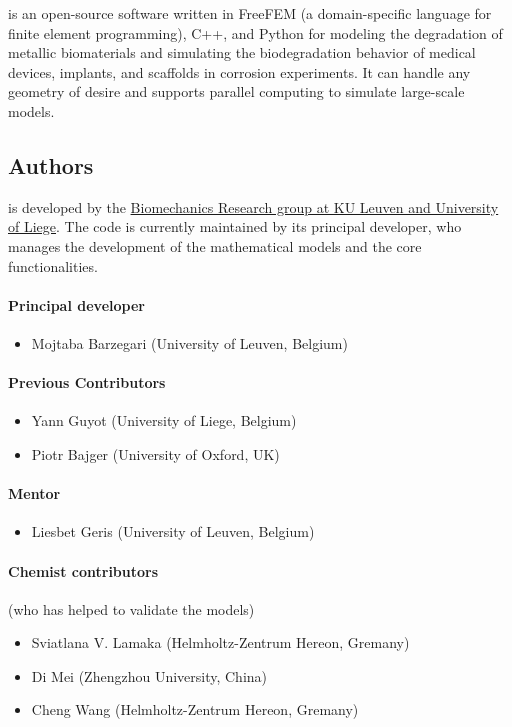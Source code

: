 \biodeg{} is an open-source software written in FreeFEM (a domain-specific language for finite element programming), C++, and Python for modeling the degradation of metallic biomaterials and simulating the biodegradation behavior of medical devices, implants, and scaffolds in corrosion experiments. It can handle any geometry of desire and supports parallel computing to simulate large-scale models.

\subsection{Authors}
\label{sec:authors}
\biodeg{} is developed by the \href{http://www.biomech.ulg.ac.be/}{Biomechanics Research group at KU Leuven and University of Liege}. The code is currently maintained by its principal developer, 
who manages the development of the mathematical models and the core functionalities. 

\paragraph*{Principal developer}
\begin{itemize}
	\item Mojtaba Barzegari (University of Leuven, Belgium)
\end{itemize}

\paragraph*{Previous Contributors}
\begin{itemize}
	\item Yann Guyot (University of Liege, Belgium)
	\item Piotr Bajger (University of Oxford, UK)
\end{itemize}

\paragraph*{Mentor}
\begin{itemize}
	\item Liesbet Geris (University of Leuven, Belgium)
\end{itemize}

\paragraph*{Chemist contributors}
(who has helped to validate the models)
\begin{itemize}
	\item Sviatlana V. Lamaka (Helmholtz-Zentrum Hereon, Gremany)
	\item Di Mei (Zhengzhou University, China)
	\item Cheng Wang (Helmholtz-Zentrum Hereon, Gremany)
\end{itemize}

